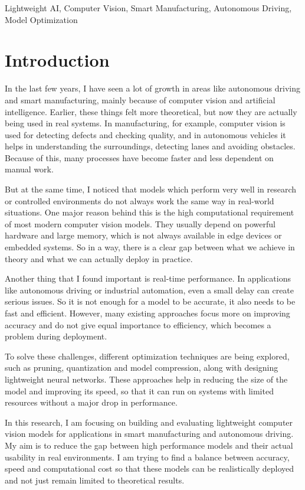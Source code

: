 \documentclass[conference]{IEEEtran}
\begin{document}
\begin{IEEEkeywords}
Lightweight AI, Computer Vision, Smart Manufacturing, Autonomous Driving, Model Optimization
\end{IEEEkeywords}

\section{Introduction}

In the last few years, I have seen a lot of growth in areas like autonomous driving and smart manufacturing, mainly because of computer vision and artificial intelligence. Earlier, these things felt more theoretical, but now they are actually being used in real systems. In manufacturing, for example, computer vision is used for detecting defects and checking quality, and in autonomous vehicles it helps in understanding the surroundings, detecting lanes and avoiding obstacles. Because of this, many processes have become faster and less dependent on manual work.

But at the same time, I noticed that models which perform very well in research or controlled environments do not always work the same way in real-world situations. One major reason behind this is the high computational requirement of most modern computer vision models. They usually depend on powerful hardware and large memory, which is not always available in edge devices or embedded systems. So in a way, there is a clear gap between what we achieve in theory and what we can actually deploy in practice.

Another thing that I found important is real-time performance. In applications like autonomous driving or industrial automation, even a small delay can create serious issues. So it is not enough for a model to be accurate, it also needs to be fast and efficient. However, many existing approaches focus more on improving accuracy and do not give equal importance to efficiency, which becomes a problem during deployment.

To solve these challenges, different optimization techniques are being explored, such as pruning, quantization and model compression, along with designing lightweight neural networks. These approaches help in reducing the size of the model and improving its speed, so that it can run on systems with limited resources without a major drop in performance.

In this research, I am focusing on building and evaluating lightweight computer vision models for applications in smart manufacturing and autonomous driving. My aim is to reduce the gap between high performance models and their actual usability in real environments. I am trying to find a balance between accuracy, speed and computational cost so that these models can be realistically deployed and not just remain limited to theoretical results.
\end{document}
